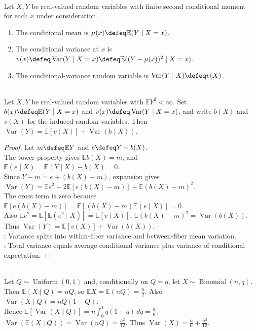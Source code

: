 \begin{definition} \label{def:conditional-variance-elementary} \\
Let $X,Y$ be real-valued random variables with finite second conditional moment for each $x$ under consideration.
\begin{enumerate}[label=(\roman*)]
\setlength{\itemsep}{0pt}
\item The conditional mean is $\mu(x)\defeq\mathbb{E}(Y\mid X=x)$.
\item The conditional variance at $x$ is $v(x)\defeq\operatorname{Var}(Y\mid X=x)\defeq\mathbb{E}((Y-\mu(x))^2\mid X=x)$.
\item The conditional-variance random variable is $\operatorname{Var}(Y\mid X)\defeq v(X)$.
\end{enumerate}
\end{definition}

\begin{theorem} \label{thm:law-total-variance} \\
Let $X,Y$ be real-valued random variables with $\mathbb{E}Y^2<\infty$.
Set $b(x)\defeq\mathbb{E}(Y\mid X=x)$ and $v(x)\defeq\operatorname{Var}(Y\mid X=x)$, and write $b(X)$ and $v(X)$ for the induced random variables.
Then $\operatorname{Var}(Y)=\mathbb{E}[v(X)]+\operatorname{Var}(b(X))$.
\begin{proof}
Let $m\defeq\mathbb{E}Y$ and $e\defeq Y-b(X)$.\\
The tower property gives $\mathbb{E}b(X)=m$, and $\mathbb{E}(e\mid X)=\mathbb{E}(Y\mid X)-b(X)=0$.\\
Since $Y-m=e+(b(X)-m)$, expansion gives $\operatorname{Var}(Y)=\mathbb{E}e^2+2\mathbb{E}[e(b(X)-m)]+\mathbb{E}(b(X)-m)^2$.\\
The cross term is zero because $\mathbb{E}[e(b(X)-m)]=\mathbb{E}[(b(X)-m)\mathbb{E}(e\mid X)]=0$.\\
Also $\mathbb{E}e^2=\mathbb{E}[\mathbb{E}(e^2\mid X)]=\mathbb{E}[v(X)]$, $\mathbb{E}(b(X)-m)^2=\operatorname{Var}(b(X))$. Thus $\operatorname{Var}(Y)=\mathbb{E}[v(X)]+\operatorname{Var}(b(X))$.\\
: Variance splits into within-fiber variance and between-fiber mean variation.\\
: Total variance equals average conditional variance plus variance of conditional expectation.
\end{proof}
\end{theorem}

\begin{example} \label{ex:total-variance-random-binomial-proportion} \\
Let $Q\sim\operatorname{Uniform}(0,1)$ and, conditionally on $Q=q$, let $X\sim\operatorname{Binomial}(n,q)$.\\
Then $\mathbb{E}(X\mid Q)=nQ$, so $\mathbb{E}X=\mathbb{E}(nQ)=\frac{n}{2}$. Also $\operatorname{Var}(X\mid Q)=nQ(1-Q)$.\\
Hence $\mathbb{E}[\operatorname{Var}(X\mid Q)]=n\int_0^1q(1-q)\,dq=\frac{n}{6}$, $\operatorname{Var}(\mathbb{E}(X\mid Q))=\operatorname{Var}(nQ)=\frac{n^2}{12}$. Thus $\operatorname{Var}(X)=\frac{n}{6}+\frac{n^2}{12}$.
\end{example}
